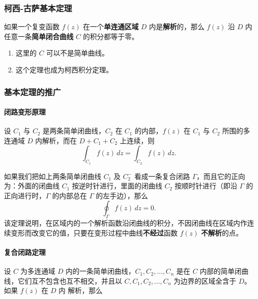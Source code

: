 \subsubsection{柯西-古萨基本定理}
\label{柯西-古萨基本定理}
如果一个复变函数 \(f(z)\) 在一个\textbf{单连通区域} \(D\) 内是\textbf{解析}的，那么 \(f(z)\) 沿 \(D\) 内任意一条\textbf{简单闭合曲线} \(C\) 的积分都等于零。

\begin{tcolorbox}[title={Note},colback=red!5!white
,colframe=red!75!black
,colbacktitle=yellow!50!red
,coltitle=red!25!black, fonttitle=\bfseries,subtitle style={boxrule=0.4pt, colback=yellow!50!red!25!white}]
\begin{enumerate}
\item 这里的 \(C\) 可以不是简单曲线。
\item 这个定理也成为柯西积分定理。
\end{enumerate}

\end{tcolorbox}
\subsubsection{基本定理的推广}
\label{基本定理的推广}
\paragraph{闭路变形原理}
\label{闭路变形原理}
设 \(C_{1}\) 与 \(C_{2}\) 是两条简单闭曲线，\(C_{2}\) 在
\(C_{1}\) 的内部，\(f(z)\) 在 \(C_{1}\) 与 \(C_{2}\) 所围的多连通域
\(D\) 内解析，而在 \(D + C_{1} + C_{2}\) 上连续，则
\[
\int_{C_{1}} f(z) \, dz = \int_{C_{2}} f(z) \, dz.
\]
\begin{tcolorbox}[title={注：},colback=red!5!white
,colframe=red!75!black
,colbacktitle=yellow!50!red
,coltitle=red!25!black, fonttitle=\bfseries,subtitle style={boxrule=0.4pt, colback=yellow!50!red!25!white}]
如果我们把如上两条简单闭曲线 \(C_{1}\) 及 \(C_{2}^{-}\)
看成一条复合闭路 \(\Gamma\)，而且它的正向为：外面的闭曲线 \(C_{1}\)
按逆时针进行，里面的闭曲线 \(C_{2}\) 按顺时针进行（即沿 \(\Gamma\)
的正向进行时，\(\Gamma\) 的内部总在 \(\Gamma\) 的左手边），那么
\[
\oint_{\Gamma} f(z) \, dz = 0.
\]
该定理说明，在区域内的一个解析函数沿闭曲线的积分，不因闭曲线在区域内作连续变形而改变它的值，只要在变形过程中曲线\textbf{不经过}函数
\(f(z)\) \textbf{不解析}的点。

\end{tcolorbox}
\paragraph{复合闭路定理}
\label{复合闭路定理}
设 \(C\) 为多连通域 \(D\) 内的一条简单闭曲线，\(C_1, C_2, \ldots, C_n\) 是在
\(C\) 内部的简单闭曲线，它们互不包含也互不相交，并且以
\(C, C_1, C_2, \ldots, C_n\) 为边界的区域全含于 \(D\)。如果 \(f(z)\) 在 \(D\) 内
解析，那么

